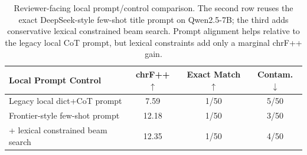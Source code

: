 \begin{table}[t]
\centering
\small
\begin{tabular}{lccc}
\toprule
Local Prompt Control & chrF++ $\uparrow$ & Exact Match $\uparrow$ & Contam. $\downarrow$ \\
\midrule
Legacy local dict+CoT prompt & 7.59 & 1/50 & 5/50 \\
Frontier-style few-shot prompt & 12.18 & 1/50 & 3/50 \\
+ lexical constrained beam search & 12.35 & 1/50 & 4/50 \\
\bottomrule
\end{tabular}
\caption{Reviewer-facing local prompt/control comparison. The second row reuses the exact DeepSeek-style few-shot title prompt on Qwen2.5-7B; the third adds conservative lexical constrained beam search. Prompt alignment helps relative to the legacy local CoT prompt, but lexical constraints add only a marginal chrF++ gain.}
\label{tab:local-prompt-controls}
\end{table}
